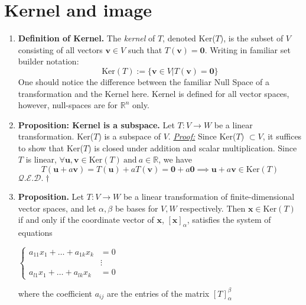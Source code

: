 \documentclass[oneside, 12pt]{book}
\newcommand{\settag}[1]{\renewcommand{\theenumi}{#1}}
\newcommand{\R}{\mathbb{R}}
\newcommand{\qed}{\hfill $\mathcal{Q}.\mathcal{E}.\mathcal{D}.\dagger$}
\newcommand{\tbf}[1]{\textbf{#1}}
\newcommand{\tit}[1]{\textit{#1}}
\newcommand{\proof}{\tit{\underline{Proof:}}} %
\newcommand{\para}[1]{\item \tbf{#1}}
\newcommand{\vv}{\mathbf{v}}
\newcommand{\vu}{\mathbf{u}}
\newcommand{\vzero}{\mathbf{0}}
\newcommand{\bx}{\mathbf{x}}
\begin{document}
\section{Kernel and image}
    \begin{enumerate}
        \settag{2.3.1}
        \item \tbf{Definition of Kernel.} The \tit{kernel} of $T$, denoted Ker($T$), is the subset of $V$ consisting of all vectors $\vv\in V$ such that $T(\vv) = \vzero$. Writing in familiar set builder notation:
        \begin{equation*}
            \text{Ker}(T) := \{\vv \in V | T(\vv) = \vzero\}
        \end{equation*}
        One should notice the difference between the familiar Null Space of a transformation and the Kernel here. Kernel is defined for all vector spaces, however, null-spaces are for $\R^n$ only.
        
        \settag{2.3.2}
        \item \tbf{Proposition: Kernel is a subspace.} Let $T: V\xrightarrow{} W$ be a linear transformation. Ker($T$) is a subspace of $V$. \newline
        \proof \newline
        Since Ker($T$) $\subset V$, it suffices to show that Ker($T$) is closed under addition and scalar multiplication. Since $T$ is linear, $\forall \vu, \vv \in \text{Ker}(T)~\text{and}~a\in \R$, we have
        \begin{equation*}
            T(\vu + a\vv) = T(\vu) + aT(\vv) = \vzero + a\vzero \implies \vu + a\vv \in \text{Ker}(T)
        \end{equation*}
        \qed
        
        \settag{2.3.7}
        \para{Proposition.} Let $T:V\rightarrow{} W$ be a linear transformation of finite-dimensional vector spaces, and let $\alpha, \beta$ be bases for $V,W$ respectively. Then $\bx \in \text{Ker}(T)$ if and only if the coordinate vector of $\bx$, $[\bx]_\alpha$, satisfies the system of equations
        \begin{center}
            $\begin{cases}
            a_{11}x_1 + \ldots + a_{1k}x_k &= 0 \\
            &\vdots \\
            a_{l1}x_1 + \ldots + a_{lk}x_k &= 0
            \end{cases}$
        \end{center}
        where the coefficient $a_{ij}$ are the entries of the matrix $[T]_\alpha^\beta$
        

\end{enumerate}
\end{document}
